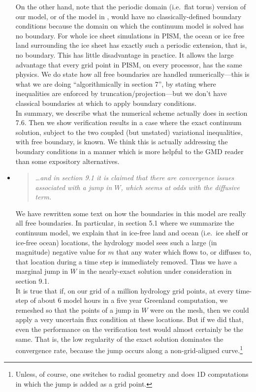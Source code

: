\documentclass[11pt,reqno]{amsart}
\newcommand{\reply}[2]{
\medskip\medskip
\item  \begin{quote}
\emph{#1}
\end{quote}

\medskip
\noindent #2}
\begin{document}
\begin{itemize}
{\indent On the other hand, note that the periodic domain (i.e.~flat torus) version of our model, or of the model in \cite{Schoofetal2012}, would have no classically-defined boundary conditions because the domain on which the continuum model is solved has no boundary.  For whole ice sheet simulations in PISM, the ocean or ice free land surrounding the ice sheet has exactly such a periodic extension, that is, no boundary.  This has little disadvantage in practice.  It allows the large advantage that every grid point in PISM, on every processor, has the same physics.  We do state how all free boundaries are handled numerically---this is what we are doing ``algorithmically in section 7'', by stating where inequalities are enforced by truncation/projection---but we don't have classical boundaries at which to apply boundary conditions. \\
\indent In summary, we describe what the numerical scheme actually does in section 7.6.  Then we show verification results in a case where the exact continuum solution, subject to the two coupled (but unstated) variational inequalities, with free boundary, is known.  We think this is actually addressing the boundary conditions in a manner which is more helpful to the GMD reader than some expository alternatives.}

\reply{\dots and in section 9.1 it is claimed that there are convergence issues associated with a jump in $W$, which seems at odds with the diffusive term.}
{We have rewritten some text on how the boundaries in this model are really all free boundaries.  In particular, in section 5.1 where we summarize the continuum model, we explain that in ice-free land and ocean (i.e.~ice shelf or ice-free ocean) locations, the hydrology model sees such a large (in magnitude) negative value for $m$ that any water which flows to, or diffuses to, that location during a time step is immediately removed.  Thus we have a marginal jump in $W$ in the nearly-exact solution under consideration in section 9.1. \\
\indent It is true that if, on our grid of a million hydrology grid points, at every time-step of about 6 model hours in a five year Greenland computation, we remeshed so that the points of a jump in $W$ were on the mesh, then we could apply a very uncertain flux condition at these locations.   But if we did that, even the performance on the verification test would almost certainly be the same.  That is, the low regularity of the exact solution dominates the convergence rate, because the jump occurs along a non-grid-aligned curve.\footnote{Unless, of course, one switches to radial geometry and does 1D computations in which the jump is added as a grid point.}}


\end{itemize}
\end{document}
